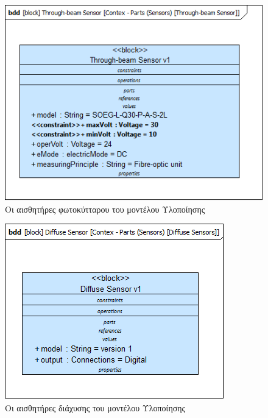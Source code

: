 \documentclass[a4paper,12pt,twoside]{report}
\begin{document}
{\begin{appendices}
				\begin{figure}[hp]
					\centering
					\includegraphics[scale=0.50]{DesignModel_Contex-Parts(Sensors)[Through-beamSensor].png}
					\caption{Οι αισθητήρες φωτοκύτταρου του μοντέλου Υλοποίησης}
					\label{φωτ:Οι αισθητήρες φωτοκύτταρου του μοντέλου Υλοποίησης}
				\end{figure}
				
				\begin{figure}[hp]
					\centering
					\includegraphics[scale=0.50]{DesignModel_Contex-Parts(Sensors)[DiffuseSensors].png}
					\caption{Οι αισθητήρες διάχυσης του μοντέλου Υλοποίησης}
					\label{φωτ:Οι αισθητήρες διάχυσης του μοντέλου Υλοποίησης}
				\end{figure}
				

\end{appendices}}
\end{document}
